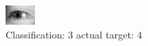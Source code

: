 \begin{figure}[h!]
\begin{center}
\includegraphics[width=0.60\columnwidth]{figures/ID3121_class_3_target_4.png}
\end{center}
\caption{ Classification: 3 actual target: 4}
\label{fig:ID3121_class_3_target_4}
\end{figure}
